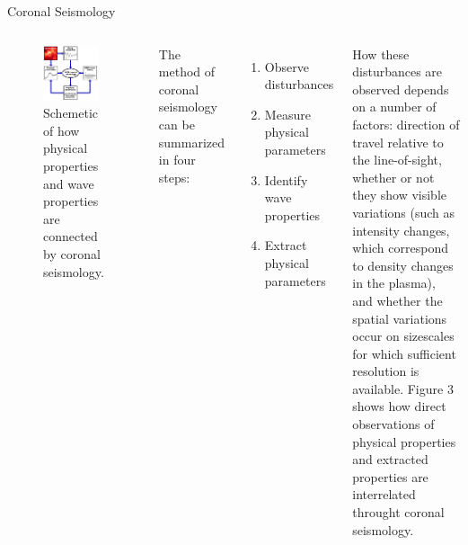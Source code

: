 \documentclass[t]{beamer}
\begin{document}
\begin{frame}[t]
\begin{block}{}
\begin{columns}
        \begin{block}{Coronal Seismology}
            \begin{columns}
                \begin{figure}
                    \includegraphics[width=0.9\textwidth]{../schematic.png}
                    \caption{Schemetic of how physical properties and
                        wave properties are connected by coronal seismology.
                    }
                \end{figure}
                The method of coronal seismology can be summarized in four
                steps:
                \begin{enumerate}
                    \item Observe disturbances
                    \item Measure physical parameters
                    \item Identify wave properties
                    \item Extract physical parameters
                \end{enumerate}
                How these disturbances are observed depends on a number of
                factors: direction of travel relative to the line-of-sight,
                whether or not they show visible variations (such as intensity
                changes, which correspond to density changes in the plasma),
                and whether the spatial variations occur on sizescales for
                which sufficient resolution is available.
                \textcolor{myblue}{Figure 3} shows how direct observations of
                physical properties and extracted properties are interrelated
                throught coronal seismology.
            \end{columns}
        \end{block}


\end{columns}
\end{block}
\end{frame}
\end{document}
